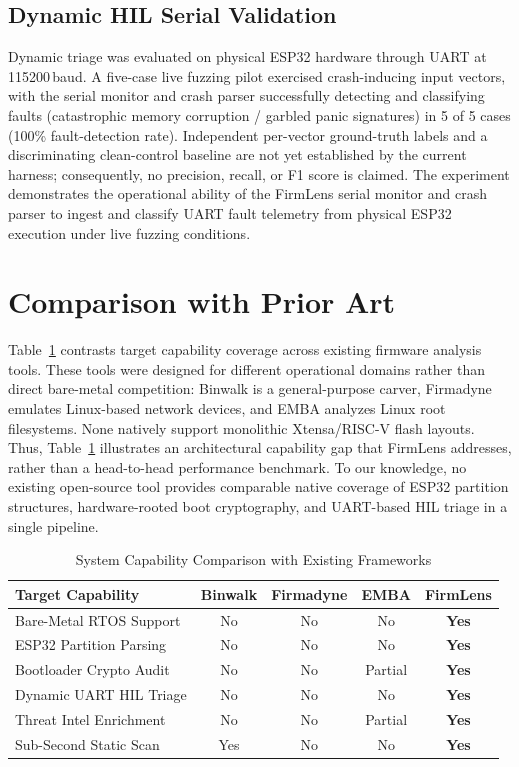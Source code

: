 \documentclass[conference]{IEEEtran}
\begin{document}
\subsection{Dynamic HIL Serial Validation}

Dynamic triage was evaluated on physical ESP32 hardware through UART at 115200\,baud. A five-case live fuzzing pilot exercised crash-inducing input vectors, with the serial monitor and crash parser successfully detecting and classifying faults (catastrophic memory corruption / garbled panic signatures) in 5 of 5 cases (100\% fault-detection rate). Independent per-vector ground-truth labels and a discriminating clean-control baseline are not yet established by the current harness; consequently, no precision, recall, or F1 score is claimed. The experiment demonstrates the operational ability of the FirmLens serial monitor and crash parser to ingest and classify UART fault telemetry from physical ESP32 execution under live fuzzing conditions.

\section{Comparison with Prior Art}

Table~\ref{tab:comparison} contrasts target capability coverage across existing firmware analysis tools. These tools were designed for different operational domains rather than direct bare-metal competition: Binwalk is a general-purpose carver, Firmadyne emulates Linux-based network devices, and EMBA analyzes Linux root filesystems. None natively support monolithic Xtensa/RISC-V flash layouts. Thus, Table~\ref{tab:comparison} illustrates an architectural capability gap that FirmLens addresses, rather than a head-to-head performance benchmark. To our knowledge, no existing open-source tool provides comparable native coverage of ESP32 partition structures, hardware-rooted boot cryptography, and UART-based HIL triage in a single pipeline.

\begin{table}[htbp]
\caption{System Capability Comparison with Existing Frameworks}
\label{tab:comparison}
\centering
\scriptsize
\setlength{\tabcolsep}{2.2pt}
\begin{tabularx}{\columnwidth}{@{}Xcccc@{}}
\toprule
\textbf{Target Capability} & \textbf{Binwalk} & \textbf{Firmadyne} & \textbf{EMBA} & \textbf{FirmLens} \\
\midrule
Bare-Metal RTOS Support    & No       & No       & No      & \textbf{Yes} \\
ESP32 Partition Parsing    & No       & No       & No      & \textbf{Yes} \\
Bootloader Crypto Audit    & No       & No       & Partial & \textbf{Yes} \\
Dynamic UART HIL Triage    & No       & No       & No      & \textbf{Yes} \\
Threat Intel Enrichment    & No       & No       & Partial & \textbf{Yes} \\
Sub-Second Static Scan     & Yes      & No       & No      & \textbf{Yes} \\
\bottomrule
\end{tabularx}
\end{table}
\end{document}
